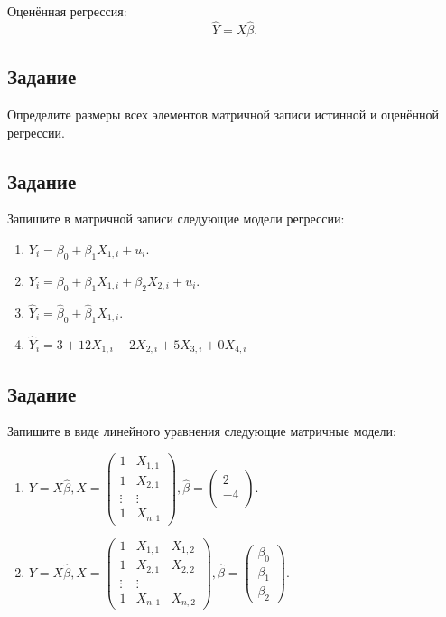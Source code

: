 \documentclass[11pt, a4paper]{extarticle}
\begin{document}
	Оценённая регрессия:
	\[
	\hat{Y} = X\hat{\beta}.
	\]

	\subsection{Задание}
	Определите размеры всех элементов матричной записи истинной и оценённой регрессии.
	
	\subsection{Задание}
	Запишите в матричной записи следующие модели регрессии:
	\begin{multicols}{2}
		\begin{enumerate}[label=\alph*)]
			\item $Y_i = \beta_0 + \beta_1X_{1, i} + u_i$.
			\item $Y_i = \beta_0 + \beta_1X_{1, i} + \beta_2X_{2, i} + u_i$.
			\item $\hat{Y}_i = \hat{\beta}_0 + \hat{\beta}_1X_{1, i}$.
			\item $\hat{Y}_i = 3 + 12X_{1, i} - 2X_{2, i} + 5X_{3, i} + 0X_{4, i}$
		\end{enumerate}
	\end{multicols}

	\subsection{Задание}
	Запишите в виде линейного уравнения следующие матричные модели:
		\begin{enumerate}[label=\alph*)]
			\item $Y = X\hat{\beta}, X = \begin{pmatrix}
			1 & X_{1, 1} \\
			1 & X_{2, 1} \\
			\vdots & \vdots \\
			1 & X_{n,1}
			\end{pmatrix}, \hat{\beta} = \begin{pmatrix}
			2 \\
			-4 \\
			\end{pmatrix}$.
			\item $Y = X\hat{\beta}, X = \begin{pmatrix}
			1 & X_{1, 1} &  X_{1, 2} \\
			1 & X_{2, 1} &  X_{2, 2} \\
			\vdots & \vdots \\
			1 & X_{n,1} &  X_{n, 2}
			\end{pmatrix}, \hat{\beta} = \begin{pmatrix}
			\beta_0 \\
			\beta_1 \\
			\beta_2
			\end{pmatrix}$.
		\end{enumerate}
	
\end{document}
